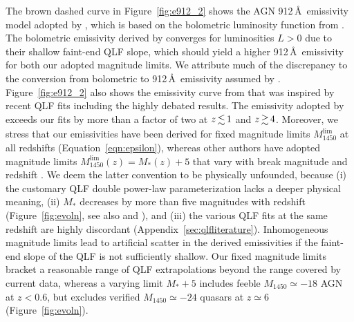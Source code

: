 \documentclass[fleqn,usenatbib]{mnras}
\begin{document}
The brown dashed curve in Figure~\ref{fig:e912_2} shows the AGN
912\,\AA\ emissivity model adopted by \citet{2012ApJ...746..125H},
which is based on the bolometric luminosity function from
\citet{2007ApJ...654..731H}.  The bolometric emissivity derived by
\citet{2007ApJ...654..731H} converges for luminosities $L>0$ due to
their shallow faint-end QLF slope, which should yield a higher
912\,\AA\ emissivity for both our adopted magnitude limits. We
attribute much of the discrepancy to the conversion from bolometric to
912\,\AA\ emissivity assumed by \citet{2007ApJ...654..731H}.
Figure~\ref{fig:e912_2} also shows the emissivity curve from
\citet{2015ApJ...813L...8M} that was inspired by recent QLF fits
including the highly debated \citet{2015AA...578A..83G} results.  The
emissivity adopted by \citet{2015ApJ...813L...8M} exceeds our fits by
more than a factor of two at $z\la 1$ and $z\ga 4$. Moreover, we
stress that our emissivities have been derived for fixed magnitude
limits $M_{1450}^\mathrm{lim}$ at all redshifts
(Equation~\eqref{eqn:epsilon}), whereas other authors have adopted
magnitude limits
$M_{1450}^\mathrm{lim}\left(z\right)=M_*\left(z\right)+5$ that vary
with break magnitude and redshift
\citep{2015AA...578A..83G,2015ApJ...813L...8M,2015MNRAS.451L..30K,2018arXiv180104931P}.
We deem the latter convention to be physically unfounded, because (i)
the customary QLF double power-law parameterization lacks a deeper
physical meaning, (ii) $M_*$ decreases by more than five magnitudes
with redshift (Figure~\ref{fig:evoln}, see also
\citealt{2013ApJ...768..105M} and \citealt{2016ApJ...829...33Y}), and
(iii) the various QLF fits at the same redshift are highly discordant
(Appendix~\ref{sec:qlfliterature}).  Inhomogeneous magnitude limits
lead to artificial scatter in the derived emissivities if the
faint-end slope of the QLF is not sufficiently shallow. Our fixed
magnitude limits bracket a reasonable range of QLF extrapolations
beyond the range covered by current data, whereas a varying limit
$M_*+5$ includes feeble $M_{1450}\simeq -18$ AGN at $z<0.6$, but
excludes verified $M_{1450}\simeq -24$ quasars at $z\simeq 6$
(Figure~\ref{fig:evoln}).
\end{document}
